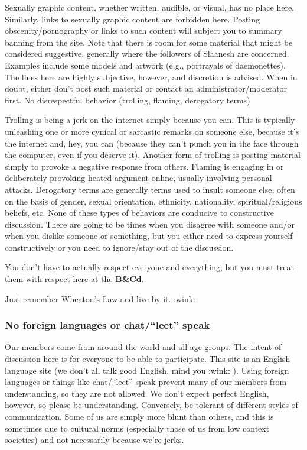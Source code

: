 \documentclass[12pt]{article}
\newcommand{\BnC}{{\textbf{B\&Cd}}}%
\begin{document}
Sexually graphic content, whether written, audible, or visual, has no 
place here. Similarly, links to sexually graphic content are forbidden 
here. Posting obscenity/pornography or links to such content will 
subject you to summary banning from the site.
Note that there is room for some material that might be considered 
suggestive, generally where the followers of Slaanesh are concerned. 
Examples include some models and artwork (e.g., portrayals of 
daemonettes). The lines here are highly subjective, however, and 
discretion is advised. When in doubt, either don't post such material 
or contact an administrator/moderator first.
No disrespectful behavior (trolling, flaming, derogatory terms)

Trolling is being a jerk on the internet simply because you can. This 
is typically unleashing one or more cynical or sarcastic remarks on 
someone else, because it's the internet and, hey, you can (because they 
can't punch you in the face through the computer, even if you deserve 
it). Another form of trolling is posting material simply to provoke a 
negative response from others.
Flaming is engaging in or deliberately provoking heated argument 
online, usually involving personal attacks.
Derogatory terms are generally terms used to insult someone else, often 
on the basis of gender, sexual orientation, ethnicity, nationality, 
spiritual/religious beliefs, etc.
None of these types of behaviors are conducive to constructive 
discussion. There are going to be times when you disagree with someone 
and/or when you dislike someone or something, but you either need to 
express yourself constructively or you need to ignore/stay out of the 
discussion.

You don't have to actually respect everyone and everything, but you 
must treat them with respect here at the {\BnC}.

Just remember Wheaton's Law and live by it. :wink:

\subsubsection{No foreign languages or chat/``leet'' speak}

Our members come from around the world and all age groups. The intent 
of discussion here is for everyone to be able to participate. This site 
is an English language site (we don't all talk good English, mind you 
:wink: ). Using foreign languages or things like chat/``leet'' speak 
prevent many of our members from understanding, so they are not 
allowed. We don't expect perfect English, however, so please be 
understanding. Conversely, be tolerant of different styles of 
communication. Some of us are simply more blunt than others, and this 
is sometimes due to cultural norms (especially those of us from low 
context societies) and not necessarily because we're jerks.
\end{document}
